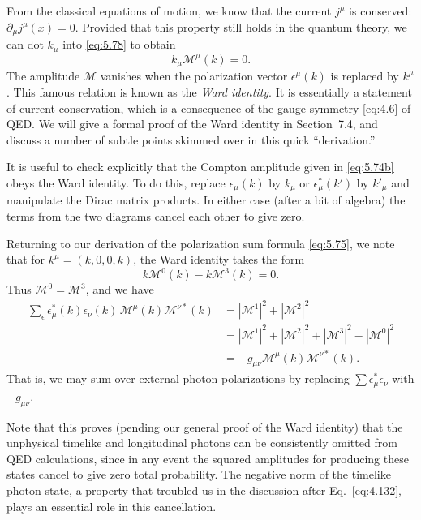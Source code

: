 From the classical equations of motion, we know that the current $j^\mu$ is
conserved: $\partial_\mu j^\mu(x) = 0$.  Provided that this property still
holds in the quantum theory, we can dot $k_\mu$ into \eqref{eq:5.78} to
obtain
\begin{equation}
  k_\mu\mathcal{M}^{\mu}(k) = 0 .
  \label{eq:5.79}
\end{equation}
The amplitude $\mathcal{M}$ vanishes when the polarization vector
$\epsilon^\mu(k)$ is replaced by $k^\mu$.  This famous relation is known as
the \emph{Ward identity}.  It is essentially a statement of current
conservation, which is a consequence of the gauge symmetry \eqref{eq:4.6} of
QED.  We will give a formal proof of the Ward identity in Section~7.4, and
discuss a number of subtle points skimmed over in this quick ``derivation.''

It is useful to check explicitly that the Compton amplitude given in
\eqref{eq:5.74b} obeys the Ward identity.  To do this, replace
$\epsilon_\mu(k)$ by $k_\mu$ or $\epsilon^{*}_\mu(k')$ by $k'_\mu$ and
manipulate the Dirac matrix products.  In either case (after a bit of algebra)
the terms from the two diagrams cancel each other to give zero.

Returning to our derivation of the polarization sum formula \eqref{eq:5.75},
we note that for $k^\mu = (k, 0, 0, k)$, the Ward identity takes the form
\begin{equation}
  k\mathcal{M}^0(k) - k\mathcal{M}^3(k) = 0 .
  \label{eq:5.80}
\end{equation}
Thus $\mathcal{M}^0 = \mathcal{M}^3$, and we have
\begin{equation}
  \begin{aligned}
    \sum_{\epsilon} \epsilon^{*}_\mu(k)\epsilon_\nu(k)\,
      \mathcal{M}^{\mu}(k)\mathcal{M}^{\nu*}(k)
    &= |\mathcal{M}^1|^2 + |\mathcal{M}^2|^2\\
    &= |\mathcal{M}^1|^2 + |\mathcal{M}^2|^2 + |\mathcal{M}^3|^2
      - |\mathcal{M}^0|^2\\
    &= -g_{\mu\nu}\mathcal{M}^{\mu}(k)\mathcal{M}^{\nu*}(k) .
  \end{aligned}
  \label{eq:5.81}
\end{equation}
That is, we may sum over external photon polarizations by replacing
$\sum \epsilon^{*}_\mu\epsilon_\nu$ with $-g_{\mu\nu}$.

Note that this proves (pending our general proof of the Ward identity) that
the unphysical timelike and longitudinal photons can be consistently omitted
from QED calculations, since in any event the squared amplitudes for
producing these states cancel to give zero total probability.  The negative
norm of the timelike photon state, a property that troubled us in the
discussion after Eq.~\eqref{eq:4.132}, plays an essential role in this
cancellation.

